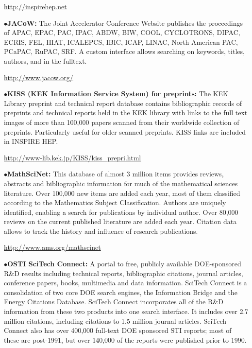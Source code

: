    \item{}\qquad\url{http://inspirehep.net}
\medskip


\item{$\bullet$}{\bf JACoW:}
The Joint Accelerator Conference Website publishes the proceedings of APAC, EPAC, PAC, IPAC, ABDW, BIW, COOL, CYCLOTRONS, DIPAC, ECRIS, FEL, HIAT, ICALEPCS, IBIC, ICAP, LINAC, North American PAC, PCaPAC, RuPAC, SRF. A custom interface allows searching on keywords, titles, authors, and in the fulltext.

   \item{}\qquad\url{http://www.jacow.org/}
\medskip

\item{$\bullet$}{\bf KISS (KEK Information Service System) for preprints:}
The KEK Library preprint and technical report database contains bibliographic records of preprints and technical reports held in the KEK library with links to the full text images of more than 100,000 papers scanned from their worldwide collection of preprints. Particularly useful for older scanned preprints. KISS links are included in INSPIRE HEP.
   \item{}\qquad\url{http://www-lib.kek.jp/KISS/kiss\_prepri.html}
\medskip

\item{$\bullet$}{\bf MathSciNet:}
This database of almost 3 million items provides reviews, abstracts and bibliographic information for much of the mathematical sciences literature. Over 100,000 new items are added each year, most of them classified according to the Mathematics Subject Classification. Authors are uniquely identified, enabling a search for publications by individual author. Over 80,000 reviews on the current published literature are added each year. Citation data allows to track the history and influence of research publications.
   \item{}\qquad\url{http://www.ams.org/mathscinet}
\medskip

\item{$\bullet$}{\bf OSTI SciTech Connect:}
A portal to free, publicly available DOE-sponsored R\&D results including technical reports, bibliographic citations, journal articles, conference papers, books, multimedia and data information. SciTech Connect is a consolidation of two core DOE search engines, the Information Bridge and the Energy Citations Database. SciTech Connect incorporates all of the R\&D information from these two products into one search interface. It includes over 2.7 million citations, including citations to 1.5 million journal articles. SciTech Connect also has over 400,000 full-text DOE sponsored STI reports; most of these are post-1991, but over 140,000 of the reports were published prior to 1990.


